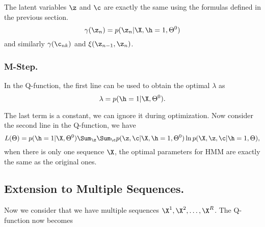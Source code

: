 The latent variables $\z$ and $\c$ are exactly the same using the formulas
defined in the previous section.
$$
\gamma(\z_n) = p(\z_n | \X, \h=1, \Theta^0)
$$
and similarly $\gamma(\c_{nk})$ and $\xi(\z_{n-1}, \z_n)$.


\subsubsection{M-Step.}
In the Q-function, the first line can be used to obtain the optimal $\lambda$ as 
$$
\lambda = p(\h=1 | \X, \Theta^0).
$$

The last term is a constant, we can ignore it during optimization. Now consider the second
line in the Q-function, we have
$$
L(\Theta) = p(\h = 1| \X, \Theta^0)
\Sum_{\z} \Sum_{\c} p(\z, \c| \X, \h=1, \Theta^0) \ln p(\X, \z, \c| \h=1, \Theta),
$$
when there is only one sequence $\X$, the optimal parameters for HMM are exactly the same
as the original ones.



\subsection{Extension to Multiple Sequences.}

Now we consider that we have multiple sequences $\X^1, \X^2, \ldots, \X^R$. The Q-function now becomes

